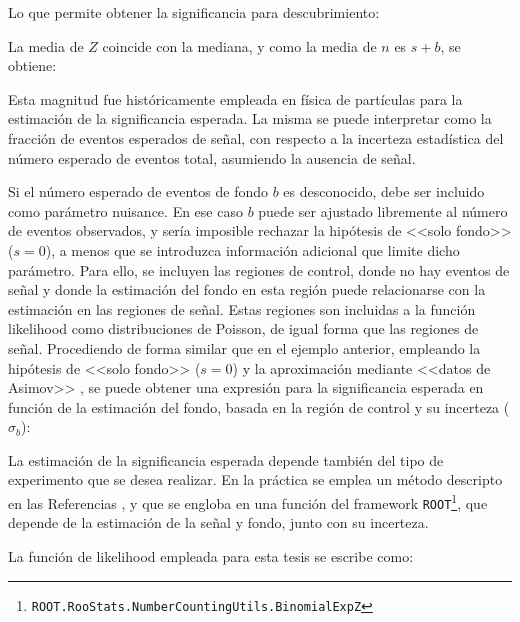 Lo que permite obtener la significancia para descubrimiento:


La media de $Z$ coincide con la mediana, y como la media de $n$ es $s+b$, se obtiene:


Esta magnitud fue históricamente empleada en física de partículas para la estimación de la significancia esperada. La misma se puede interpretar como la fracción de eventos esperados de señal, con respecto a la incerteza estadística del número esperado de eventos total, asumiendo la ausencia de señal.

Si el número esperado de eventos de fondo $b$ es desconocido, debe ser incluido como parámetro nuisance. En ese caso $b$ puede ser ajustado libremente al número de eventos observados, y sería imposible rechazar la hipótesis de <<solo fondo>> ($s=0$), a menos que se introduzca información adicional que limite dicho parámetro. Para ello, se incluyen las regiones de control, donde no hay eventos de señal y donde la estimación del fondo en esta región puede relacionarse con la estimación en las regiones de señal. Estas regiones son incluidas a la función likelihood como distribuciones de Poisson, de igual forma que las regiones de señal. Procediendo de forma similar que en el ejemplo anterior, empleando la hipótesis de <<solo fondo>> ($s=0$) y la aproximación mediante <<datos de Asimov>> \cite{Cowan:2010js}, se puede obtener una expresión para la significancia esperada en función de la estimación del fondo, basada en la región de control y su incerteza ($\sigma_b$):



La estimación de la significancia esperada depende también del tipo de experimento que se desea realizar. En la práctica se emplea un método descripto en las Referencias \cite{Linnemann:2003vw, stat_1, ATL-PHYS-PUB-2020-025}, y que se engloba en una función del framework \texttt{ROOT}\footnote{\texttt{ROOT.RooStats.NumberCountingUtils.BinomialExpZ}}, que depende de la estimación de la señal y fondo, junto con su incerteza. 




La función de likelihood empleada para esta tesis se escribe como:




